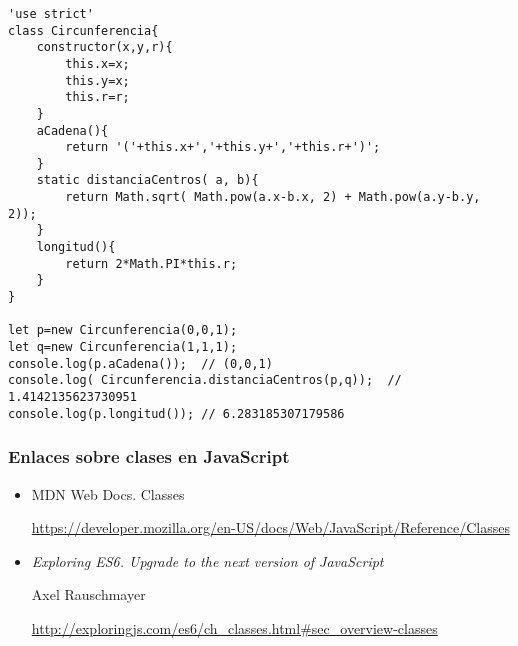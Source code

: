 \documentclass[ucs]{beamer}
\begin{document}
\begin{frame}[fragile]
\frametitle{}
  \begin{scriptsize}
  \begin{verbatim}
'use strict'
class Circunferencia{
    constructor(x,y,r){
        this.x=x;
        this.y=x;
        this.r=r;
    }
    aCadena(){
        return '('+this.x+','+this.y+','+this.r+')';
    }
    static distanciaCentros( a, b){
        return Math.sqrt( Math.pow(a.x-b.x, 2) + Math.pow(a.y-b.y, 2));
    }
    longitud(){
        return 2*Math.PI*this.r;
    }
}

let p=new Circunferencia(0,0,1);
let q=new Circunferencia(1,1,1);
console.log(p.aCadena());  // (0,0,1)
console.log( Circunferencia.distanciaCentros(p,q));  // 1.4142135623730951
console.log(p.longitud()); // 6.283185307179586
  \end{verbatim}
  \end{scriptsize}
\end{frame}

\begin{frame}[fragile]
\frametitle{Enlaces sobre clases en JavaScript}
\begin{itemize}
\item
MDN Web Docs. Classes

\begin{tiny}
\begin{flushright}
\url{https://developer.mozilla.org/en-US/docs/Web/JavaScript/Reference/Classes}
\end{flushright}
\end{tiny}
\item
\emph{Exploring ES6. Upgrade to the next version of JavaScript}

Axel Rauschmayer

\begin{tiny}
\begin{flushright}
\url{http://exploringjs.com/es6/ch_classes.html#sec_overview-classes}
\end{flushright}
\end{tiny}
\end{itemize}
\end{frame}
\end{document}

